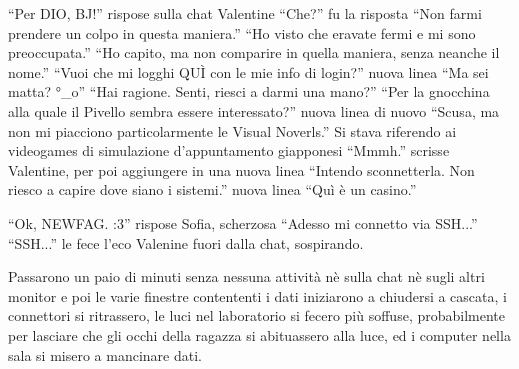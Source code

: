     ``Per DIO, BJ!'' rispose sulla chat Valentine ``Che?'' fu la risposta ``Non farmi prendere un colpo in questa
    maniera.'' ``Ho visto che eravate fermi e mi sono preoccupata.'' ``Ho capito, ma non comparire in quella maniera,
    senza neanche il nome.'' ``Vuoi che mi logghi QUÌ con le mie info di login?'' nuova linea ``Ma sei matta? °\_o''
    ``Hai ragione. Senti, riesci a darmi una mano?'' ``Per la gnocchina alla quale il Pivello sembra essere
    interessato?'' nuova linea di nuovo ``Scusa, ma non mi piacciono particolarmente le Visual Noverls.'' Si stava
    riferendo ai videogames di simulazione d'appuntamento giapponesi ``Mmmh.'' scrisse Valentine, per poi aggiungere in
    una nuova linea ``Intendo sconnetterla. Non riesco a capire dove siano i sistemi.'' nuova linea ``Quì è un casino.''

    ``Ok, NEWFAG. :3'' rispose Sofia, scherzosa ``Adesso mi connetto via SSH...'' ``SSH...'' le fece l'eco Valenine
    fuori dalla chat, sospirando.

    Passarono un paio di minuti senza nessuna attività nè sulla chat nè sugli altri monitor e poi le varie finestre
    contententi i dati iniziarono a chiudersi a cascata, i connettori si ritrassero, le luci nel laboratorio si fecero
    più soffuse, probabilmente per lasciare che gli occhi della ragazza si abituassero alla luce, ed i computer nella
    sala si misero a mancinare dati.
